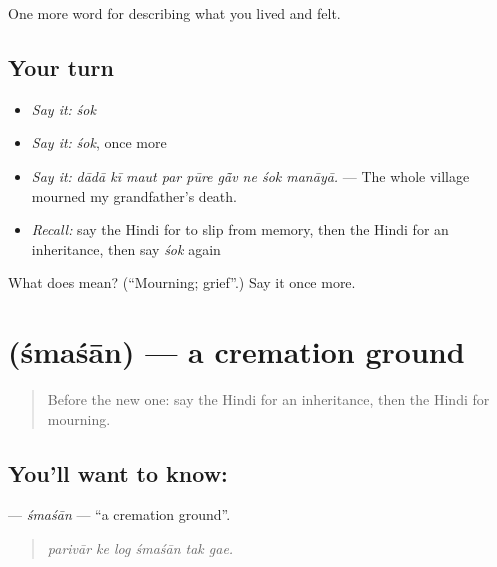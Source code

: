 \begin{grammarlens}[title={What you've built}]
One more word for describing what you lived and felt.
\end{grammarlens}

\subsection*{Your turn}
\begin{itemize}
\raggedright
  \item \emph{Say it:} \emph{śok}
  \item \emph{Say it:} \emph{śok}, once more
  \item \emph{Say it:} \emph{dādā kī maut par pūre gā̃v ne śok manāyā.} — The whole village mourned my grandfather's death.
  \item \emph{Recall:} say the Hindi for to slip from memory, then the Hindi for an inheritance, then say \emph{śok} again
\end{itemize}

\begin{tcolorbox}[breakable,colback=teal!4,colframe=teal!35!black,title={Before you move on}]
What does  mean? (\textquotedblleft{}Mourning; grief\textquotedblright{}.) Say it once more.
\end{tcolorbox}
\section[\texorpdfstring{\hi{श्मशान} (śmaśān)}{श्मशान (śmaśān)}]{ (śmaśān) — a cremation ground}

\label{lesson:HI-C505-smasan}



\begin{quote}
Before the new one: say the Hindi for an inheritance, then the Hindi for mourning.
\end{quote}

\subsection*{You'll want to know: }
\textbf{} — \emph{śmaśān} — \textquotedblleft{}a cremation ground\textquotedblright{}.

\begin{quote}
     
\end{quote}

\begin{quote}
\emph{parivār ke log śmaśān tak gae.}
\end{quote}

